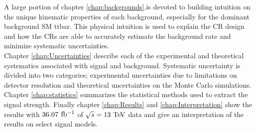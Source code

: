 \indent  A large portion of chapter \ref{chap:backgrounds}.is devoted to building intuition on the unique kinematic properties of each background, especially for the dominant background SM ttbar.  This physical intuition is used to explain the CR design and how the CRs are able to accurately estimate the background rate and minimize systematic uncertainties.  \\

\indent Chapter \ref{chap:Uncertainties} describe each of the experimental and theoretical systematics associated with signal and background.  Systematic uncertainty is divided into two categories; experimental uncertainties due to limitations on detector resolution and theoretical uncertainties on the Monte Carlo simulations. \\

\indent Chapter \ref{chap:statistics} summarizes the statistical methods used to extract the signal strength.  Finally chapter \ref{chap:Results} and \ref{chap:Interpretation} show the results with $36.07$ $\mbox{fb$^{-1}$}$ of $\sqrt{s} = 13 \tev$ data and give an interpretation of the results on select signal models.  \\



